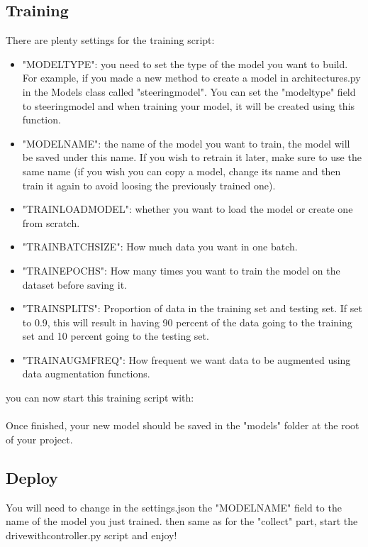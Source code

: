 \documentclass[12pt]{article}
\begin{document}
\subsection{Training}
There are plenty settings for the training script:\\
\begin{itemize}
    \item "MODEL\textunderscore TYPE": you need to set the type of the model you want to build. For example, if you made a new method to create a model in architectures.py in the Models class called "steering\textunderscore model". You can set the "model\textunderscore type" field to steering\textunderscore model and when training your model, it will be created using this function.
    \item "MODEL\textunderscore NAME": the name of the model you want to train, the model will be saved under this name. If you wish to retrain it later, make sure to use the same name (if you wish you can copy a model, change its name and then train it again to avoid loosing the previously trained one).
    \item "TRAIN\textunderscore LOAD\textunderscore MODEL": whether you want to load the model or create one from scratch.
    \item "TRAIN\textunderscore BATCH\textunderscore SIZE": How much data you want in one batch.
    \item "TRAIN\textunderscore EPOCHS": How many times you want to train the model on the dataset before saving it.
    \item "TRAIN\textunderscore SPLITS": Proportion of data in the training set and testing set. If set to 0.9, this will result in having 90 percent of the data going to the training set and 10 percent going to the testing set.
    \item "TRAIN\textunderscore AUGM\textunderscore FREQ": How frequent we want data to be augmented using data augmentation functions.
\end{itemize}


you can now start this training script with:\\
\noindent{}\\

Once finished, your new model should be saved in the "models" folder at the root of your project.\\

\subsection{Deploy}
You will need to change in the settings.json the "MODEL\textunderscore NAME" field to the name of the model you just trained. then same as for the "collect" part, start the drive\textunderscore with\textunderscore controller.py script and enjoy! \\

\noindent{}\\
\end{document}
